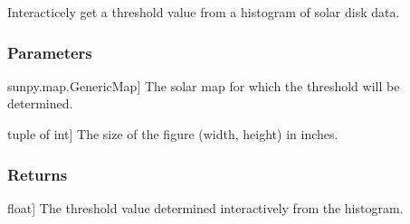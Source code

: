 \documentclass[letterpaper,10pt,english]{sphinxmanual}
\begin{document}
\begin{fulllineitems}
\label{\detokenize{pycatch/utils/plot:pycatch.utils.plot.get_thr_from_hist}}
\pysigstartsignatures
{}
\pysigstopsignatures
\sphinxAtStartPar
Interacticely get a threshold value from a histogram of solar disk data.


\subsubsection{Parameters}
\label{\detokenize{pycatch/utils/plot:id4}}\begin{description}
\sphinxlineitem{map}{[}sunpy.map.GenericMap{]}
\sphinxAtStartPar
The solar map for which the threshold will be determined.

\sphinxlineitem{fsize}{[}tuple of int{]}
\sphinxAtStartPar
The size of the figure (width, height) in inches.

\end{description}


\subsubsection{Returns}
\label{\detokenize{pycatch/utils/plot:id5}}\begin{description}
\sphinxlineitem{thr}{[}float{]}
\sphinxAtStartPar
The threshold value determined interactively from the histogram.

\end{description}

\end{fulllineitems}

\end{document}
